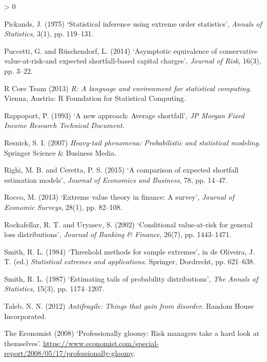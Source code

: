 \documentclass[a4paper,11pt]{article}
\newlength{\cslhangindent}
\newenvironment{CSLReferences}[2] %
 {%
  \setlength{\parindent}{0pt}
  \ifodd #1 \everypar{\setlength{\hangindent}{\cslhangindent}}\ignorespaces\fi
  \ifnum #2 > 0
  \setlength{\parskip}{#2\baselineskip}
  \fi
 }%
 {}
\theoremstyle{definition}
\theoremstyle{definition}
\theoremstyle{definition}
\theoremstyle{definition}
\theoremstyle{remark}
\begin{document}
\begin{CSLReferences}{0}{0}
\leavevmode\hypertarget{ref-pickands1975statistical}{}%
Pickands, J. (1975) {`Statistical inference using extreme order statistics'}, \emph{Annals of Statistics}, 3(1), pp. 119--131.

\leavevmode\hypertarget{ref-puccetti2014asymptotic}{}%
Puccetti, G. and Rüschendorf, L. (2014) {`Asymptotic equivalence of conservative value-at-risk-and expected shortfall-based capital charges'}, \emph{Journal of Risk}, 16(3), pp. 3--22.

\leavevmode\hypertarget{ref-R}{}%
R Core Team (2013) \emph{R: A language and environment for statistical computing}. Vienna, Austria: R Foundation for Statistical Computing.

\leavevmode\hypertarget{ref-rappoport1993new}{}%
Rappoport, P. (1993) {`A new approach: Average shortfall'}, \emph{JP Morgan Fixed Income Research Technical Document}.

\leavevmode\hypertarget{ref-resnick2007heavy}{}%
Resnick, S. I. (2007) \emph{Heavy-tail phenomena: Probabilistic and statistical modeling}. Springer Science \& Business Media.

\leavevmode\hypertarget{ref-righi2015comparison}{}%
Righi, M. B. and Ceretta, P. S. (2015) {`A comparison of expected shortfall estimation models'}, \emph{Journal of Economics and Business}, 78, pp. 14--47.

\leavevmode\hypertarget{ref-rocco2013}{}%
Rocco, M. (2013) {`Extreme value theory in finance: A survey'}, \emph{Journal of Economic Surveys}, 28(1), pp. 82--108.

\leavevmode\hypertarget{ref-rockafellar2002conditional}{}%
Rockafellar, R. T. and Uryasev, S. (2002) {`Conditional value-at-risk for general loss distributions'}, \emph{Journal of Banking \& Finance}, 26(7), pp. 1443--1471.

\leavevmode\hypertarget{ref-smith1984}{}%
Smith, R. L. (1984) {`Threshold methods for sample extremes'}, in de Oliveira, J. T. (ed.) \emph{Statistical extremes and applications}. Springer, Dordrecht, pp. 621--638.

\leavevmode\hypertarget{ref-smith1987estimating}{}%
Smith, R. L. (1987) {`Estimating tails of probability distributions'}, \emph{The Annals of Statistics}, 15(3), pp. 1174--1207.

\leavevmode\hypertarget{ref-taleb2012antifragile}{}%
Taleb, N. N. (2012) \emph{Antifragile: Things that gain from disorder}. Random House Incorporated.

\leavevmode\hypertarget{ref-economist}{}%
The Economist (2008) {`{Professionally gloomy: Risk managers take a hard look at themselves}'}. \url{https://www.economist.com/special-report/2008/05/17/professionally-gloomy}.


\end{CSLReferences}
\end{document}
